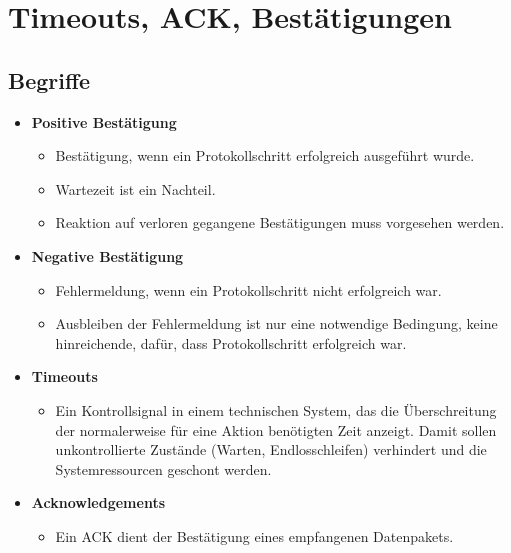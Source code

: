 \documentclass{article} %
\begin{document}


\section{Timeouts, ACK, Bestätigungen}
	\subsection{Begriffe}
	\begin{itemize}
		\item \textbf{Positive Bestätigung}
		\begin{itemize}
			\item Bestätigung, wenn ein Protokollschritt erfolgreich ausgeführt wurde.
			\item Wartezeit ist ein Nachteil.
			\item Reaktion auf verloren gegangene Bestätigungen muss
			vorgesehen werden.
		\end{itemize}
		\item \textbf{Negative Bestätigung}
		\begin{itemize}
			\item Fehlermeldung, wenn ein Protokollschritt nicht erfolgreich war.
			\item Ausbleiben der Fehlermeldung ist nur eine notwendige
			Bedingung, keine hinreichende, dafür, dass Protokollschritt
			erfolgreich war.
		\end{itemize}		
		\item \textbf{Timeouts}
		\begin{itemize}
			\item Ein Kontrollsignal in einem technischen System, das die Überschreitung der normalerweise für eine Aktion benötigten Zeit anzeigt. Damit sollen unkontrollierte Zustände (Warten, Endlosschleifen) verhindert und die Systemressourcen geschont werden.\cite{timeout}
		\end{itemize}		
		\item \textbf{Acknowledgements}
		\begin{itemize}
			\item Ein ACK dient der Bestätigung eines empfangenen Datenpakets.
		\end{itemize}
	\end{itemize}
	
\end{document}
